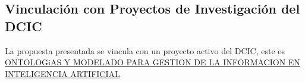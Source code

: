 \documentclass{article}
\begin{document}
\subsection*{Vinculación con Proyectos de Investigación del DCIC}
La propuesta presentada se vincula con un proyecto activo del DCIC, este es
\href{https://uns.edu.ar/investigacion/proyectos/busqueda\_proy.php?i1=43768\&proyecto=80020230400001SU\&vigentes=V}{ONTOLOGiAS Y MODELADO PARA GESTION DE LA INFORMACION EN INTELIGENCIA ARTIFICIAL}
\end{document}
